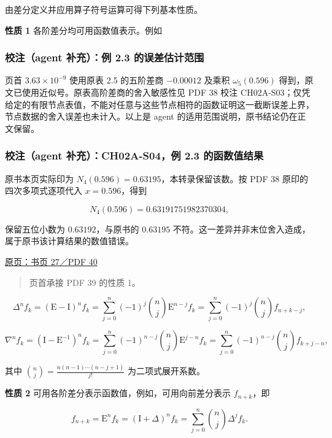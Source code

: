 \documentclass[
  10pt,
  fontset=fandol]{ctexart}
\begin{document}
由差分定义并应用算子符号运算可得下列基本性质。

\textbf{性质 1} 各阶差分均可用函数值表示。例如

\subsubsection{校注（agent 补充）：例 2.3 的误差估计范围}\label{ux6821ux6ce8agent-ux8865ux5145ux4f8b-2.3-ux7684ux8befux5deeux4f30ux8ba1ux8303ux56f4}

页首 \(3.63\times10^{-9}\) 使用原表 2.5 的五阶差商 \(-0.00012\) 及乘积 \(\omega_5(0.596)\) 得到，原文已使用近似号。原表高阶差商的舍入敏感性见 PDF 38 校注 CH02A-S03；仅凭给定的有限节点表值，不能对任意与这些节点相符的函数证明这一截断误差上界，节点数据的舍入误差也未计入。以上是 agent 的适用范围说明，原书结论仍在正文保留。

\subsubsection{校注（agent 补充）：CH02A-S04，例 2.3 的函数值结果}\label{ux6821ux6ce8agent-ux8865ux5145ch02a-s04ux4f8b-2.3-ux7684ux51fdux6570ux503cux7ed3ux679c}

原书本页实际印为 \(N_4(0.596)=0.63195\)，本转录保留该数。按 PDF 38 原印的四次多项式逐项代入 \(x=0.596\)，得到

\[
N_4(0.596)=0.63191751982370304,
\]

保留五位小数为 \(0.63192\)，与原书的 \(0.63195\) 不符。这一差异并非末位舍入造成，属于原书该计算结果的数值错误。

\href{../../source-images/pdf-040.jpeg}{原页：书页 27／PDF 40}

\begin{quote}
页首承接 PDF 39 的性质 1。
\end{quote}

\[
\Delta^n f_k=(\mathrm{E}-\mathrm{I})^n f_k
=\sum_{j=0}^{n}(-1)^j\binom{n}{j}\mathrm{E}^{n-j}f_k
=\sum_{j=0}^{n}(-1)^j\binom{n}{j}f_{n+k-j},
\tag{2.5.4}
\]

\[
\nabla^n f_k=(\mathrm{I}-\mathrm{E}^{-1})^n f_k
=\sum_{j=0}^{n}(-1)^{n-j}\binom{n}{j}\mathrm{E}^{j-n}f_k
=\sum_{j=0}^{n}(-1)^{n-j}\binom{n}{j}f_{k+j-n},
\tag{2.5.5}
\]

其中 \(\displaystyle\binom{n}{j}=\frac{n(n-1)\cdots(n-j+1)}{j!}\) 为二项式展开系数。

\textbf{性质 2} 可用各阶差分表示函数值，例如，可用向前差分表示 \(f_{n+k}\)，即

\[
f_{n+k}=\mathrm{E}^n f_k=(\mathrm{I}+\Delta)^n f_k=\sum_{j=0}^{n}\binom{n}{j}\Delta^j f_k.
\tag{2.5.6}
\]
\end{document}
